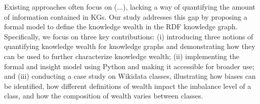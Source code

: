 Existing approaches often focus on (...), lacking a way of quantifying the amount of information contained in KGs. Our study addresses this gap by proposing a formal model to define the knowledge wealth in the RDF knowledge graph. Specifically, we focus on three key contributions: (i) introducing three notions of quantifying knowledge wealth for knowledge graphs and demonstrating how they can be used to further characterize knowledge wealth; (ii) implementing the formal and insight model using Python and making it accessible for broader use; and (iii) conducting a case study on Wikidata classes, illustrating how biases can be identified, how different definitions of wealth impact the imbalance level of a class, and how the composition of wealth varies between classes.